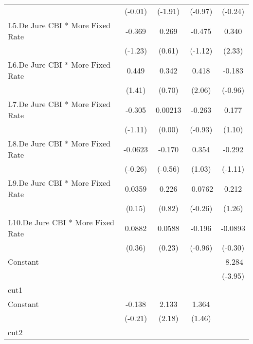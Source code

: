 {\begin{longtable}{l*{4}{c}}
                &  (-0.01)         &  (-1.91)         &  (-0.97)         &  (-0.24)         \\
[1em]
L5.De Jure CBI * More Fixed Rate&   -0.369         &    0.269         &   -0.475         &    0.340\sym{*}  \\
                &  (-1.23)         &   (0.61)         &  (-1.12)         &   (2.33)         \\
[1em]
L6.De Jure CBI * More Fixed Rate&    0.449         &    0.342         &    0.418\sym{*}  &   -0.183         \\
                &   (1.41)         &   (0.70)         &   (2.06)         &  (-0.96)         \\
[1em]
L7.De Jure CBI * More Fixed Rate&   -0.305         &  0.00213         &   -0.263         &    0.177         \\
                &  (-1.11)         &   (0.00)         &  (-0.93)         &   (1.10)         \\
[1em]
L8.De Jure CBI * More Fixed Rate&  -0.0623         &   -0.170         &    0.354         &   -0.292         \\
                &  (-0.26)         &  (-0.56)         &   (1.03)         &  (-1.11)         \\
[1em]
L9.De Jure CBI * More Fixed Rate&   0.0359         &    0.226         &  -0.0762         &    0.212         \\
                &   (0.15)         &   (0.82)         &  (-0.26)         &   (1.26)         \\
[1em]
L10.De Jure CBI * More Fixed Rate&   0.0882         &   0.0588         &   -0.196         &  -0.0893         \\
                &   (0.36)         &   (0.23)         &  (-0.96)         &  (-0.30)         \\
[1em]
Constant        &                  &                  &                  &   -8.284\sym{***}\\
                &                  &                  &                  &  (-3.95)         \\
\hline
cut1            &                  &                  &                  &                  \\
Constant        &   -0.138         &    2.133\sym{*}  &    1.364         &                  \\
                &  (-0.21)         &   (2.18)         &   (1.46)         &                  \\
\hline
cut2            &                  &                  &                  &                  \\

\end{longtable}}
